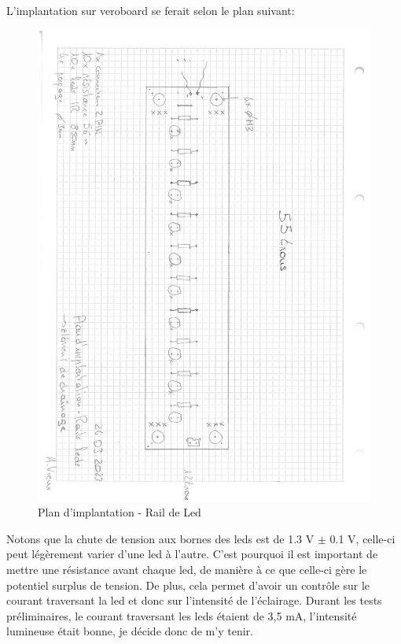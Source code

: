 L'implantation sur veroboard se ferait selon le plan suivant:
\begin{figure}[H]
    \centering
    \includegraphics[width=13cm, trim=0 0 3cm 1cm, clip]{assets/figures/plan_implantation_rail_led.pdf}
    \caption{Plan d'implantation - Rail de Led}
\end{figure}

Notons que la chute de tension aux bornes des leds est de 1.3 V $\pm$ 0.1 V, celle-ci peut légèrement varier d'une led à l'autre. C'est
pourquoi il est important de mettre une résistance avant chaque led, de manière à ce que celle-ci gère le potentiel surplus de tension.
De plus, cela permet d'avoir un contrôle sur le courant traversant la led et donc sur l'intensité de l'éclairage. Durant les tests préliminaires,
le courant traversant les leds étaient de 3,5 \si{\milli\A}, l'intensité lumineuse était bonne, je décide donc de m'y tenir.

